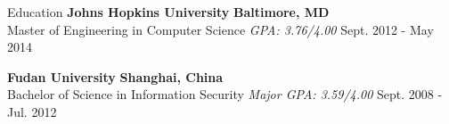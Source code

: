 \documentclass{resume} %
\begin{document}

\begin{rSection}{Education}
{\bf Johns Hopkins University} \hfill {\bf Baltimore, MD} \\
{Master of Engineering in Computer Science} {\em GPA: 3.76/4.00} \hfill {Sept. 2012 - May 2014}

{\bf Fudan University} \hfill {\bf Shanghai, China} \\
{Bachelor of Science in Information Security} {\em Major GPA: 3.59/4.00} \hfill {Sept. 2008 - Jul. 2012}
\end{rSection}
%
%


\end{document}
